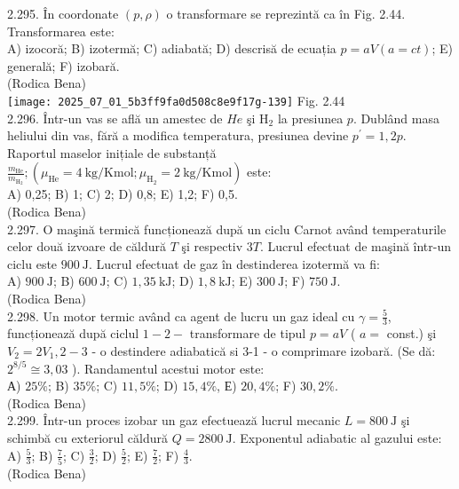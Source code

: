 2.295. În coordonate $(p, \rho)$ o transformare se reprezintă ca în Fig. 2.44. Transformarea este:\\ A) izocoră; B) izotermă; C) adiabată; D) descrisă de ecuația $p=a V(a=c t)$; E) generală; F) izobară.\\ (Rodica Bena)\\ \texttt{[image: 2025\_07\_01\_5b3ff9fa0d508c8e9f17g-139]} Fig. 2.44\\

2.296. Într-un vas se află un amestec de $He$ şi $\mathrm{H}_{2}$ la presiunea $p$. Dublând masa heliului din vas, fără a modifica temperatura, presiunea devine $p^{\prime}=1,2 p$. Raportul maselor inițiale de substanță $\frac{m_{\mathrm{He}}}{m_{\mathrm{H}_{2}}} ;\left(\mu_{\mathrm{He}}=4 \mathrm{~kg} / \mathrm{Kmol} ; \mu_{\mathrm{H}_{2}}=2 \mathrm{~kg} / \mathrm{Kmol}\right)$ este:\\ A) 0,25; B) 1; C) 2; D) 0,8; E) 1,2; F) 0,5.\\ (Rodica Bena)\\

2.297. O maşină termică funcționează după un ciclu Carnot având temperaturile celor două izvoare de căldură $T$ şi respectiv $3 T$. Lucrul efectuat de maşină într-un ciclu este $900 \mathrm{~J}$. Lucrul efectuat de gaz în destinderea izotermă va fi:\\ A) $900 \mathrm{~J}$; B) $600 \mathrm{~J}$; C) $1,35 \mathrm{~kJ}$; D) $1,8 \mathrm{~kJ}$; E) $300 \mathrm{~J}$; F) $750 \mathrm{~J}$.\\ (Rodica Bena)\\

2.298. Un motor termic având ca agent de lucru un gaz ideal cu $\gamma=\frac{5}{3}$, funcționează după ciclul $1-2-$ transformare de tipul $p=a V$ ( $a=$ const.) şi $V_{2}=2 V_{1}, 2-3$ - o destindere adiabatică si 3-1 - o comprimare izobară. (Se dă: $2^{8 / 5} \cong 3,03$ ). Randamentul acestui motor este:\\ А) $25 \%$; B) $35 \%$; C) $11,5 \%$; D) $15,4 \%$, Е) $20,4 \%$; F) $30,2 \%$.\\ (Rodica Bena)\\

2.299. Într-un proces izobar un gaz efectuează lucrul mecanic $L=800 \mathrm{~J}$ şi schimbă cu exteriorul căldură $Q=2800 \mathrm{~J}$. Exponentul adiabatic al gazului este:\\ A) $\frac{5}{3}$; B) $\frac{7}{5}$; C) $\frac{3}{2}$; D) $\frac{5}{2}$; E) $\frac{7}{2}$; F) $\frac{4}{3}$.\\ (Rodica Bena)\\

